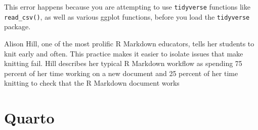 \documentclass[
]{book}
\newenvironment{Shaded}{\begin{snugshade}}{\end{snugshade}}
\newcommand{\AnnotationTok}[1]{\textcolor[rgb]{0.56,0.35,0.01}{\textbf{\textit{#1}}}}
\newcommand{\CommentTok}[1]{\textcolor[rgb]{0.56,0.35,0.01}{\textit{#1}}}
\newcommand{\InformationTok}[1]{\textcolor[rgb]{0.56,0.35,0.01}{\textbf{\textit{#1}}}}
\begin{document}
\begin{Shaded}
\end{Shaded}

This error happens because you are attempting to use \texttt{tidyverse} functions like \texttt{read\_csv()}, as well as various ggplot functions, before you load the \texttt{tidyverse} package.

Alison Hill, one of the most prolific R Markdown educators, tells her students to knit early and often. This practice makes it easier to isolate issues that make knitting fail. Hill describes her typical R Markdown workflow as spending 75 percent of her time working on a new document and 25 percent of her time knitting to check that the R Markdown document works

\hypertarget{quarto}{%
\section*{Quarto}\label{quarto}}
\end{document}
